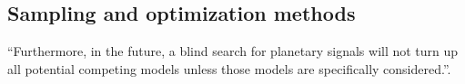 \documentclass[12pt]{report}
\begin{document}
\subsection{Sampling and optimization methods}
%
%
``Furthermore, in the future, a blind search for planetary signals will not
turn up all potential competing models unless those models
are specifically considered.''\citep{2017AJ....153..129J}.
\citet{2021AJ....162...59R}
\citet{2020AJ....160...17H}
\end{document}
